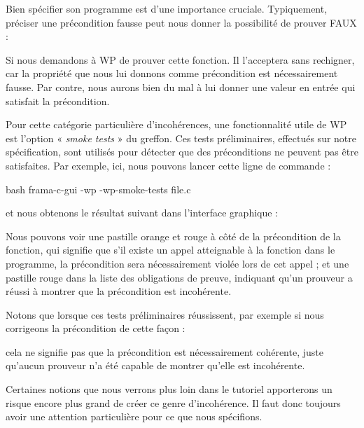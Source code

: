 

Bien spécifier son programme est d'une importance cruciale. Typiquement,
préciser une précondition fausse peut nous donner la possibilité de prouver
FAUX :




Si nous demandons à WP de prouver cette fonction. Il l'acceptera sans rechigner,
car la propriété que nous lui donnons comme précondition est nécessairement fausse.
Par contre, nous aurons bien du mal à lui donner une valeur en entrée qui satisfait
la précondition.


Pour cette catégorie particulière d'incohérences, une fonctionnalité utile de WP
est l'option « \textit{smoke tests} » du greffon. Ces tests préliminaires, effectués
sur notre spécification, sont utilisés pour détecter que des préconditions ne peuvent
pas être satisfaites. Par exemple, ici, nous pouvons lancer cette ligne de
commande :


\begin{CodeBlock}{bash}
  frama-c-gui -wp -wp-smoke-tests file.c
\end{CodeBlock}


et nous obtenons le résultat suivant dans l'interface graphique :




Nous pouvons voir une pastille orange et rouge à côté de la précondition de la
fonction, qui signifie que s'il existe un appel atteignable à la fonction dans
le programme, la précondition sera nécessairement violée lors de cet appel ; et
une pastille rouge dans la liste des obligations de preuve, indiquant qu'un
prouveur a réussi à montrer que la précondition est incohérente.


Notons que lorsque ces tests préliminaires réussissent, par exemple si
nous corrigeons la précondition de cette façon :




cela ne signifie pas que la précondition est nécessairement cohérente, juste
qu'aucun prouveur n'a été capable de montrer qu'elle est incohérente.


Certaines notions que nous verrons plus loin dans le tutoriel apporterons un
risque encore plus grand de créer ce genre d'incohérence. Il faut donc toujours
avoir une attention particulière pour ce que nous spécifions.





